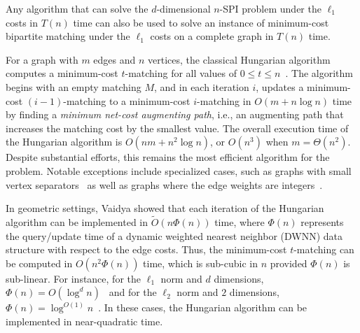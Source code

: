 \begin{lemma}\label{lemma:kSPI_reduction}
Any algorithm that can solve the $d$-dimensional $n$-SPI problem under the $\ell_1$ costs in $T(n)$ time can also be used to solve an instance of minimum-cost bipartite matching under the $\ell_1$ costs on a complete graph in $T(n)$ time.
\end{lemma} 


%








For a graph with $m$ edges and $n$ vertices, the classical Hungarian algorithm computes a minimum-cost $t$-matching for all values of $0\le t\le n$~\cite{kuhn1955hungarian, phatak2022computing}. The algorithm begins with an empty matching $M$, and in each iteration $i$, updates a minimum-cost $(i-1)$-matching to a minimum-cost $i$-matching in $O(m+n\log n)$ time by finding a \emph{minimum net-cost augmenting path}, i.e., an augmenting path that increases the matching cost by the smallest value. The overall execution time of the Hungarian algorithm is $O(nm+n^2\log n)$, or $O(n^3)$ when $m = \Theta(n^2)$.  
Despite substantial efforts, this remains the most efficient algorithm for the problem. Notable exceptions include specialized cases, such as graphs with small vertex separators~\cite{lipton1980applications} as well as graphs where the edge weights are integers~\cite{chen2022maximum,gt_sjc89,gt_jacm91}. 
%


In geometric settings, Vaidya showed that each iteration of the Hungarian algorithm can be implemented in $\tilde{O}(n\Phi(n))$ time, where $\Phi(n)$ represents the query/update time of a dynamic weighted nearest neighbor (DWNN) data structure with respect to the edge costs. Thus, the minimum-cost $t$-matching can be computed in $O(n^2 \Phi(n))$ time, which is sub-cubic in $n$ provided $\Phi(n)$ is sub-linear.  For instance, for the $\ell_1$ norm and $d$ dimensions, $\Phi(n)=O(\log^d n)$~\cite{vaidya1989geometry} and for the $\ell_2$ norm and $2$ dimensions, $\Phi(n)=\log^{O(1)}n$~\cite{kaplan2020dynamic}. In these cases, the Hungarian algorithm can be implemented in near-quadratic time.  

